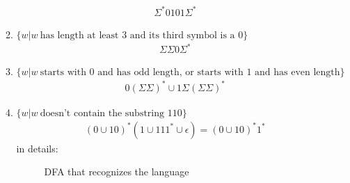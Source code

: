 \begin{enumerate}
\begin{enumerate}
\begin{align*}
                        \Sigma^*0101\Sigma^*
                    \end{align*}
              \item $\{w|w~ \text{has length at least }3\text{ and its third symbol is a }0\}$
                    \begin{align*}
                        \Sigma\Sigma0\Sigma^*
                    \end{align*}
              \item $\{w|w~ \text{starts with }0\text{ and has odd length, or starts with }1\text{ and has even length}\}$
                    \begin{align*}
                        0(\Sigma\Sigma)^* \cup 1\Sigma(\Sigma\Sigma)^*
                    \end{align*}
              \item $\{w|w~ \text{doesn't contain the substring }110\}$
                    \begin{align*}
                        (0 \cup 10)^\ast (1 \cup 111^\ast \cup \epsilon) = 
                        (0 \cup 10)^\ast 1^\ast
                    \end{align*}
                    in details:
                    
                    \begin{figure}[H]
                        \centering
                        \caption{DFA that recognizes the language}
                    \end{figure}
                    

\end{enumerate}
\end{enumerate}
